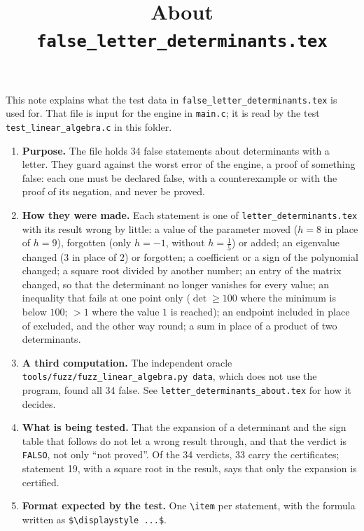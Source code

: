 \documentclass[11pt,a4paper]{article}
\title{About \texttt{false\_letter\_determinants.tex}}
\author{}
\date{}
\begin{document}
\maketitle
This note explains what the test data in \texttt{false\_letter\_determinants.tex} is used for. That file is input for the engine in \texttt{main.c}; it is read by the test \texttt{test\_linear\_algebra.c} in this folder.

\begin{enumerate}
\item \textbf{Purpose.} The file holds 34 false statements about determinants with a letter. They guard against the worst error of the engine, a proof of something false: each one must be declared false, with a counterexample or with the proof of its negation, and never be proved.

\item \textbf{How they were made.} Each statement is one of \texttt{letter\_determinants.tex} with its result wrong by little: a value of the parameter moved ($h = 8$ in place of $h = 9$), forgotten (only $h = -1$, without $h = \frac{1}{5}$) or added; an eigenvalue changed ($3$ in place of $2$) or forgotten; a coefficient or a sign of the polynomial changed; a square root divided by another number; an entry of the matrix changed, so that the determinant no longer vanishes for every value; an inequality that fails at one point only ($\det \ge 100$ where the minimum is below $100$; $> 1$ where the value $1$ is reached); an endpoint included in place of excluded, and the other way round; a sum in place of a product of two determinants.

\item \textbf{A third computation.} The independent oracle \texttt{tools/fuzz/fuzz\_linear\_algebra.py data}, which does not use the program, found all 34 false. See \texttt{letter\_determinants\_about.tex} for how it decides.

\item \textbf{What is being tested.} That the expansion of a determinant and the sign table that follows do not let a wrong result through, and that the verdict is \texttt{FALSO}, not only ``not proved''. Of the 34 verdicts, 33 carry the certificates; statement 19, with a square root in the result, says that only the expansion is certified.

\item \textbf{Format expected by the test.} One \texttt{\textbackslash item} per statement, with the formula written as \texttt{\$\textbackslash displaystyle ...\$}.


\end{enumerate}
\end{document}
